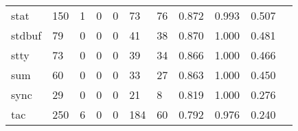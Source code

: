 \begin{longtable}{lp{1.2cm}p{1.2cm}p{1.2cm}p{1.2cm}p{1.2cm}p{1.2cm}p{1.2cm}p{1.2cm}p{1.2cm}p{1.2cm}}
stat      &                                   150 &                                                  1 &                                                  0 &                                                  0 &                                                 73 &                                                 76 &                                         0.872 &                                              0.993 &                                              0.507 \\
stdbuf    &                                    79 &                                                  0 &                                                  0 &                                                  0 &                                                 41 &                                                 38 &                                         0.870 &                                              1.000 &                                              0.481 \\
stty      &                                    73 &                                                  0 &                                                  0 &                                                  0 &                                                 39 &                                                 34 &                                         0.866 &                                              1.000 &                                              0.466 \\
sum       &                                    60 &                                                  0 &                                                  0 &                                                  0 &                                                 33 &                                                 27 &                                         0.863 &                                              1.000 &                                              0.450 \\
sync      &                                    29 &                                                  0 &                                                  0 &                                                  0 &                                                 21 &                                                  8 &                                         0.819 &                                              1.000 &                                              0.276 \\
tac       &                                   250 &                                                  6 &                                                  0 &                                                  0 &                                                184 &                                                 60 &                                         0.792 &                                              0.976 &                                              0.240 \\

\end{longtable}
